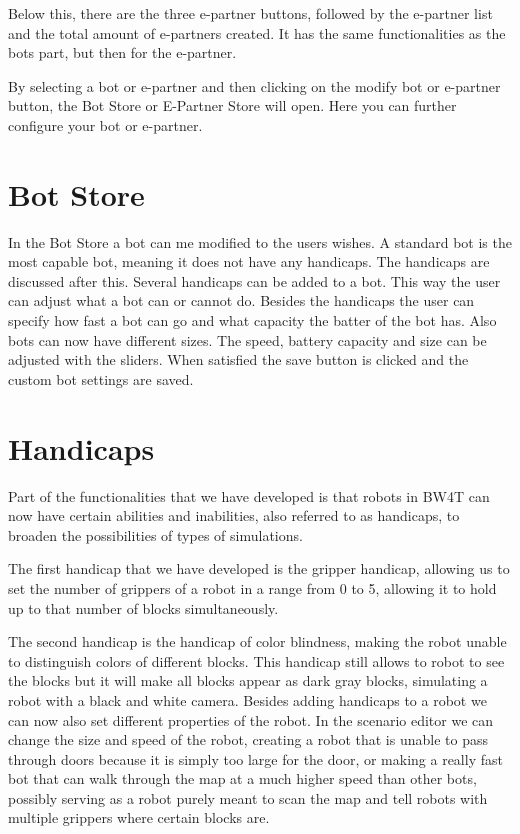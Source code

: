 Below this, there are the three e-partner buttons, followed by the e-partner list and the total amount of e-partners created. It has the same functionalities as the bots part, but then for the e-partner.

By selecting a bot or e-partner and then clicking on the modify bot or e-partner button, the Bot Store or E-Partner Store will open. Here you can further configure your bot or e-partner.

\section{Bot Store}
In the Bot Store a bot can me modified to the users wishes. A standard bot is the most capable bot, meaning it does not have any handicaps. The handicaps are discussed after this. Several handicaps can be added to a bot. This way the user can adjust what a bot can or cannot do. Besides the handicaps the user can specify how fast a bot can go and what capacity the batter of the bot has. Also bots can now have different sizes. The speed, battery capacity and size can be adjusted with the sliders. When satisfied the save button is clicked and the custom bot settings are saved. 

\section{Handicaps}
Part of the functionalities that we have developed is that robots in BW4T can now have certain abilities and inabilities, also referred to as handicaps, to broaden the possibilities of types of simulations.

The first handicap that we have developed is the gripper handicap, allowing us to set the number of grippers of a robot in a range from 0 to 5, allowing it to hold up to that number of blocks simultaneously.

The second handicap is the handicap of color blindness, making the robot unable to distinguish colors of different blocks. This handicap still allows to robot to see the blocks but it will make all blocks appear as dark gray blocks, simulating a robot with a black and white camera.
Besides adding handicaps to a robot we can now also set different properties of the robot. In the scenario editor we can change the size and speed of the robot, creating a robot that is unable to pass through doors because it is simply too large for the door, or making a really fast bot that can walk through the map at a much higher speed than other bots, possibly serving as a robot purely meant to scan the map and tell robots with multiple grippers where certain blocks are.

